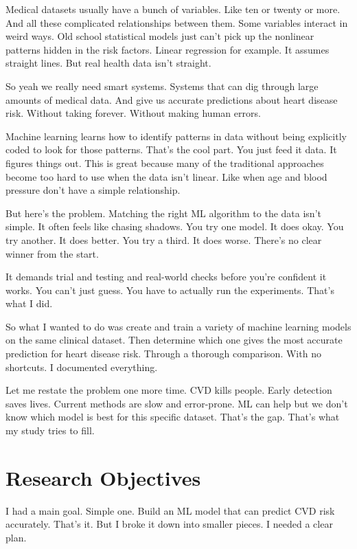 \documentclass[12pt, a4paper, oneside]{book}
\begin{document}
Medical datasets usually have a bunch of variables. Like ten or twenty or more. And all these complicated relationships between them. Some variables interact in weird ways. Old school statistical models just can't pick up the nonlinear patterns hidden in the risk factors. Linear regression for example. It assumes straight lines. But real health data isn't straight.

So yeah we really need smart systems. Systems that can dig through large amounts of medical data. And give us accurate predictions about heart disease risk. Without taking forever. Without making human errors.

Machine learning learns how to identify patterns in data without being explicitly coded to look for those patterns. That's the cool part. You just feed it data. It figures things out. This is great because many of the traditional approaches become too hard to use when the data isn't linear. Like when age and blood pressure don't have a simple relationship.

But here's the problem. Matching the right ML algorithm to the data isn't simple. It often feels like chasing shadows. You try one model. It does okay. You try another. It does better. You try a third. It does worse. There's no clear winner from the start.

It demands trial and testing and real-world checks before you're confident it works. You can't just guess. You have to actually run the experiments. That's what I did.

So what I wanted to do was create and train a variety of machine learning models on the same clinical dataset. Then determine which one gives the most accurate prediction for heart disease risk. Through a thorough comparison. With no shortcuts. I documented everything.

Let me restate the problem one more time. CVD kills people. Early detection saves lives. Current methods are slow and error-prone. ML can help but we don't know which model is best for this specific dataset. That's the gap. That's what my study tries to fill.

\section{Research Objectives}

I had a main goal. Simple one. Build an ML model that can predict CVD risk accurately. That's it. But I broke it down into smaller pieces. I needed a clear plan.
\end{document}

